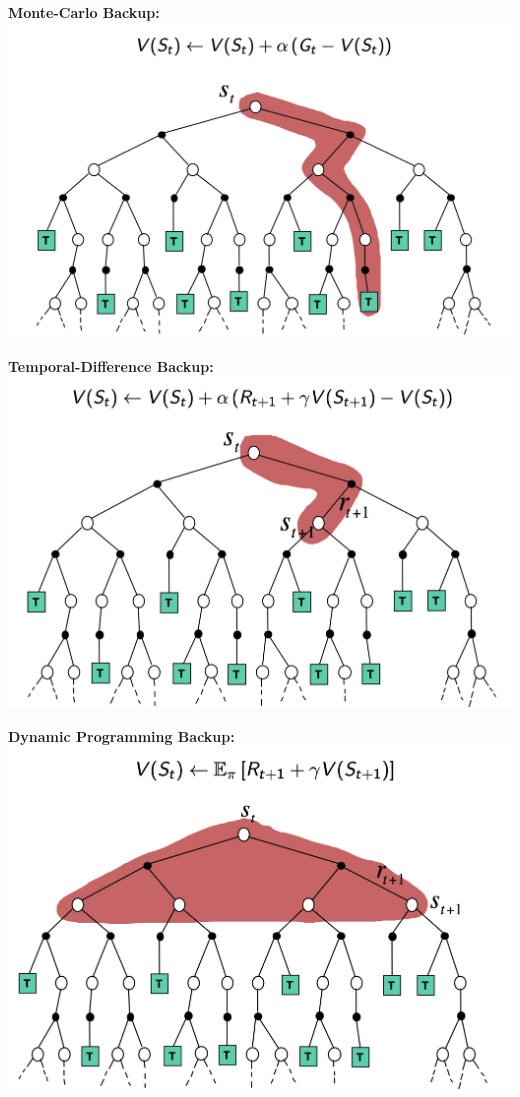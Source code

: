 \documentclass[10pt]{article}
\begin{document}
\begin{center}
\begin{minipage}[t]{0.45\textwidth}
\textbf{Monte-Carlo Backup:}
\includegraphics[width=\textwidth]{pictures/mc_backup.jpg}
\end{minipage} \hfill
\begin{minipage}[t]{0.45\textwidth}
\textbf{Temporal-Difference Backup:}
\includegraphics[width=\textwidth]{pictures/td_backup.jpg}
\end{minipage}
\newline \newline \newline
\begin{minipage}[t]{0.45\textwidth}
\textbf{Dynamic Programming Backup:}
\includegraphics[width=\textwidth]{pictures/dp_backup.jpg}


\end{minipage}
\end{center}
\end{document}
